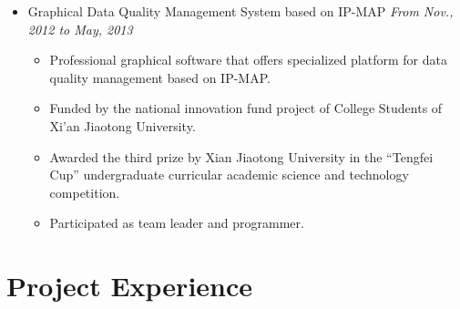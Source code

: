 \documentclass[letterpaper,11pt]{article}
\newenvironment{extra}{}{}
\begin{document}
\begin{itemize}
\begin{extra}
    \item Graphical Data Quality Management System based on IP-MAP \hfill \textit{From Nov., 2012 to May,
2013}
    \begin{itemize}
        \item Professional graphical software that offers specialized platform for data quality management based on IP-MAP.
        \item Funded by the national innovation fund project of College Students of Xi’an Jiaotong University.
        \item Awarded the third prize by Xian Jiaotong University in the “Tengfei Cup” undergraduate
curricular academic science and technology competition.
        \item Participated as team leader and programmer.
    \end{itemize}
\end{extra}

\end{itemize}


\section{Project Experience}
\end{document}
